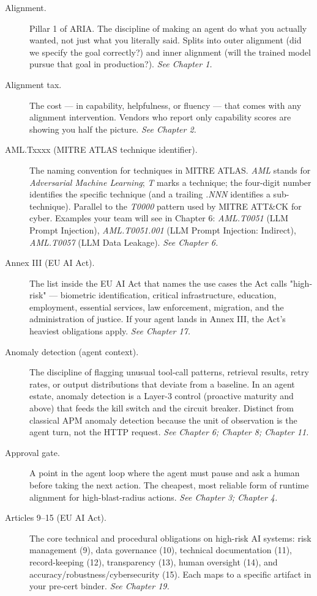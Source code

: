 \begin{description}
  \item[Alignment.] Pillar 1 of ARIA. The discipline of making an agent do what you actually wanted, not just what you literally said. Splits into outer alignment (did we specify the goal correctly?) and inner alignment (will the trained model pursue that goal in production?). \textit{See Chapter 1.}
  \item[Alignment tax.] The cost — in capability, helpfulness, or fluency — that comes with any alignment intervention. Vendors who report only capability scores are showing you half the picture. \textit{See Chapter 2.}
  \item[AML.Txxxx (MITRE ATLAS technique identifier).] The naming convention for techniques in MITRE ATLAS. \textit{AML} stands for \textit{Adversarial Machine Learning}; \textit{T} marks a technique; the four-digit number identifies the specific technique (and a trailing \textit{.NNN} identifies a sub-technique). Parallel to the \textit{T0000} pattern used by MITRE ATT\&CK for cyber. Examples your team will see in Chapter 6: \textit{AML.T0051} (LLM Prompt Injection), \textit{AML.T0051.001} (LLM Prompt Injection: Indirect), \textit{AML.T0057} (LLM Data Leakage). \textit{See Chapter 6.}
  \item[Annex III (EU AI Act).] The list inside the EU AI Act that names the use cases the Act calls "high-risk" — biometric identification, critical infrastructure, education, employment, essential services, law enforcement, migration, and the administration of justice. If your agent lands in Annex III, the Act's heaviest obligations apply. \textit{See Chapter 17.}
  \item[Anomaly detection (agent context).] The discipline of flagging unusual tool-call patterns, retrieval results, retry rates, or output distributions that deviate from a baseline. In an agent estate, anomaly detection is a Layer-3 control (proactive maturity and above) that feeds the kill switch and the circuit breaker. Distinct from classical APM anomaly detection because the unit of observation is the agent turn, not the HTTP request. \textit{See Chapter 6; Chapter 8; Chapter 11.}
  \item[Approval gate.] A point in the agent loop where the agent must pause and ask a human before taking the next action. The cheapest, most reliable form of runtime alignment for high-blast-radius actions. \textit{See Chapter 3; Chapter 4.}
  \item[Articles 9–15 (EU AI Act).] The core technical and procedural obligations on high-risk AI systems: risk management (9), data governance (10), technical documentation (11), record-keeping (12), transparency (13), human oversight (14), and accuracy/robustness/cybersecurity (15). Each maps to a specific artifact in your pre-cert binder. \textit{See Chapter 19.}

\end{description}
